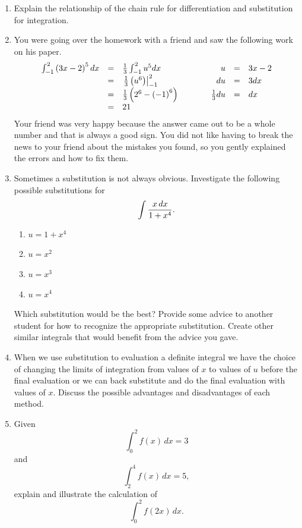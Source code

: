 \begin{enumerate}
\item   Explain the relationship of the chain rule for differentiation and substitution for integration.







\item   You were going over the homework with a friend and saw the following work on his paper.
		$$\begin{array}{rclcrcl}
\int_{ - 1}^2 {\left( {3x - 2} \right)^5 dx} & =& {1 \over 3}\int_{ - 1}^2 {u^5 dx} &\ \ \ \ \ \ \mbox{}& u &=& 3x - 2 \cr  
  & =& \left. {{1 \over 3}\left( {u^6 } \right)} \right|_{ - 1}^2 &&  du &=& 3dx \cr  
  &  =& {1 \over 3}\left( {2^6  - \left( { - 1} \right)^6 } \right) &&  {1 \over 3}du &=& dx \cr    
  &= &21&& \cr\end{array}$$
Your friend was very happy because the answer came out to be a whole number and that is always a good sign.  You did not like having to break the news to your friend about the mistakes you found, so you gently explained the errors and how to fix them.

\item   Sometimes a substitution is not always obvious.  Investigate the following possible substitutions for $$\int {{{x\,dx} \over {1 + x^4 }}} .$$	
\begin{enumerate} \item $u = 1 + x^4$\item $u = x^2$\item $u = x^3$\item $u = x^4$\end{enumerate}
Which substitution would be the best?  Provide some advice to another student for how to recognize the appropriate substitution.  Create other similar integrals that would benefit from the advice you gave.

\item   When we use substitution to evaluation a definite integral we have the choice of changing the limits of integration from values of $x$ to values of $u$ before the final evaluation or we can back substitute and do the final evaluation with values of $x$.  Discuss the possible advantages and disadvantages of each method.  \cite{EP}

\item   Given $$\int_0^2 {f(x)\,dx}  = 3$$ and $$\int_2^4 {f(x)\,dx}  = 5,$$ explain and illustrate the calculation of $$\int_0^2 {f(2x)\,dx} .$$  


\end{enumerate}
